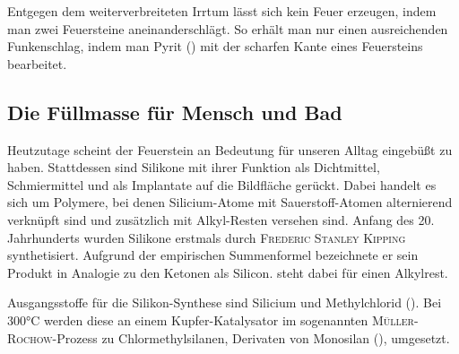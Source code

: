 \documentclass[../kl10.tex]{subfiles}
\begin{document}
Entgegen dem weiterverbreiteten Irrtum lässt sich kein Feuer erzeugen, indem man zwei Feuersteine aneinanderschlägt. So erhält man nur einen ausreichenden Funkenschlag, indem man Pyrit () mit der scharfen Kante eines Feuersteins bearbeitet.


\subsection{Die Füllmasse für Mensch und Bad} 
Heutzutage scheint der Feuerstein an Bedeutung für unseren Alltag eingebüßt zu haben. Stattdessen sind Silikone mit ihrer Funktion als Dichtmittel, Schmiermittel und als Implantate auf die Bildfläche gerückt.  Dabei handelt es sich um Polymere, bei denen Silicium-Atome mit Sauerstoff-Atomen alternierend verknüpft sind und zusätzlich mit Alkyl-Resten versehen sind.
Anfang des 20. Jahrhunderts wurden Silikone erstmals durch \textsc{Frederic Stanley Kipping} synthetisiert. Aufgrund der empirischen Summenformel  bezeichnete er sein Produkt in Analogie zu den Ketonen als Silicon.  steht dabei für einen Alkylrest.




Ausgangsstoffe für die Silikon-Synthese sind Silicium und Methylchlorid (). Bei 300\thinspace °C werden diese an einem Kupfer-Katalysator im sogenannten \textsc{Müller-Rochow}-Prozess zu Chlormethylsilanen, Derivaten von Monosilan  (), umgesetzt. 
\end{document}
